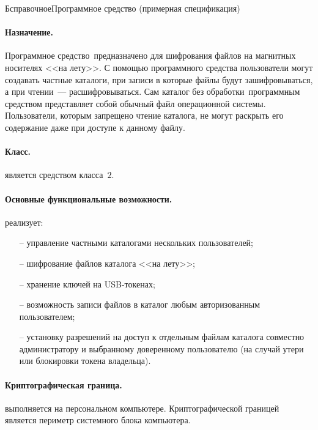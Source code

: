 \providecommand{\CryptoKernel}{<<{Криптоядро}>>\xspace}
\begin{appendix}{Б}{справочное}{Программное средство \CryptoDisk 
(примерная спецификация)}
\label{EXAMPLE} 


\paragraph*{Назначение.} 
Программное средство~\CryptoDisk предназначено для шифрования 
файлов на магнитных носителях <<на лету>>. 
%
С помощью программного средства пользователи могут создавать частные каталоги,
при записи в которые файлы будут зашифровываться, 
а при чтении~--- расшифровываться.
%
Сам каталог без обработки~программным средством представляет 
собой обычный файл операционной системы. 
%
Пользователи, которым запрещено чтение каталога,
не могут раскрыть его содержание даже при доступе к данному файлу.

\paragraph*{Класс.} 
\CryptoDisk является средством класса~$2$.

\paragraph*{Основные функциональные возможности.} 
\CryptoDisk реализует:
\begin{itemize}
\item[--]
управление частными каталогами нескольких пользователей;
\item[--]
шифрование файлов каталога <<на лету>>;
\item[--]
хранение ключей на USB-токенах;
\item[--]
возможность записи файлов в каталог 
любым авторизованным пользователем;
\item[--]
установку разрешений на доступ к отдельным файлам 
каталога совместно администратору и выбранному доверенному пользователю 
(на случай утери или блокировки токена владельца).
\end{itemize}

\paragraph*{Криптографическая граница.}
\CryptoDisk выполняется на персональном компьютере. 
Криптографической границей является периметр системного 
блока компьютера.


\end{appendix}
